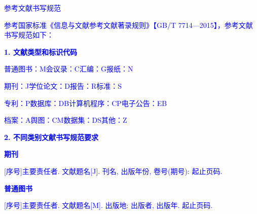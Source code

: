 %
%
%
%
%

\begin{bibprint}


\BiblatexSplitbibDefernumbersWarningOff

\textcolor{blue}{参考文献书写规范}

\textcolor{blue}{参考国家标准《信息与文献参考文献著录规则》【GB/T 7714—2015】，参考文献书写规范如下：}

\textcolor{blue}{\textbf{1. 文献类型和标识代码}}

\textcolor{blue}{普通图书：M}\qquad\textcolor{blue}{会议录：C}\qquad\textcolor{blue}{汇编：G}\qquad\textcolor{blue}{报纸：N}

\textcolor{blue}{期刊：J}\qquad\textcolor{blue}{学位论文：D}\qquad\textcolor{blue}{报告：R}\qquad\textcolor{blue}{标准：S}

\textcolor{blue}{专利：P}\qquad\textcolor{blue}{数据库：DB}\qquad\textcolor{blue}{计算机程序：CP}\qquad\textcolor{blue}{电子公告：EB}

\textcolor{blue}{档案：A}\qquad\textcolor{blue}{舆图：CM}\qquad\textcolor{blue}{数据集：DS}\qquad\textcolor{blue}{其他：Z}

\textcolor{blue}{\textbf{2. 不同类别文献书写规范要求}}

\textcolor{blue}{\textbf{期刊}}

\noindent\textcolor{blue}{[序号]主要责任者. 文献题名[J]. 刊名, 出版年份, 卷号(期号): 起止页码. }

\printbibliography [type=article,heading=none] 

\textcolor{blue}{\textbf{普通图书}}

\noindent\textcolor{blue}{[序号]主要责任者. 文献题名[M]. 出版地: 出版者, 出版年. 起止页码. }
\cite{Raymer1992Aircraft}


\end{bibprint}
